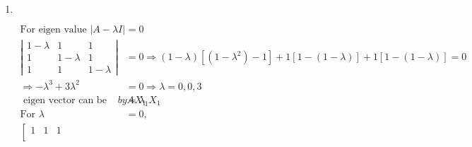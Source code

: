 \begin{enumerate}
\begin{answer}
\begin{align*}
\begin{array}{c}
	k_{1} \\
	k_{2}
	\end{array}\right] \text { if } k_{1}=k_{2}\\
	X_{1}&=k_{1}\left[\begin{array}{c}-2 \\ 1 \\ 1\end{array}\right]\text{ from orthogonality condition }X_{1}^{T} X_{1}=1 \Rightarrow k_{1}=\frac{1}{2}\\
	X_{1}&=\frac{1}{2}\left[\begin{array}{c}-2 \\ 1 \\ 1\end{array}\right]\\
	\text{For }\lambda&=-1\text{ similarly if }k_{1}=1, k_{2}=-1\\
	\text{Then }X_{2}=\left[\begin{array}{c}0 \\ 1 \\ -1\end{array}\right] \quad X_{2}&=\frac{1}{\sqrt{2}}\left[\begin{array}{c}0 \\ 1 \\ -1\end{array}\right]
		\end{align*}
	So the correct answer is \textbf{Option (a)}
	\end{answer}
	\item $\left. \right. $
	\begin{answer}
		\begin{align*}
		 \text{For eigen value }|A-\lambda I|&=0\\
		\left|\begin{array}{ccc}
		1-\lambda & 1 & 1 \\
		1 & 1-\lambda & 1 \\
		1 & 1 & 1-\lambda
		\end{array}\right|&=0 \Rightarrow(1-\lambda)\left[\left(1-\lambda^{2}\right)-1\right]+1[1-(1-\lambda)]+1[1-(1-\lambda)]=0\\
		\Rightarrow-\lambda^{3}+3 \lambda^{2}&=0 \Rightarrow \lambda=0,0,3\\
	\text{	eigen vector can be determine }by A X_{1}&=\lambda_{1} X_{1}\\
		\text{For }\lambda&=0,\\
		\left[\begin{array}{lll}
		1 & 1 & 1 \\

\end{array}
\end{align*}
\end{answer}
\end{enumerate}
